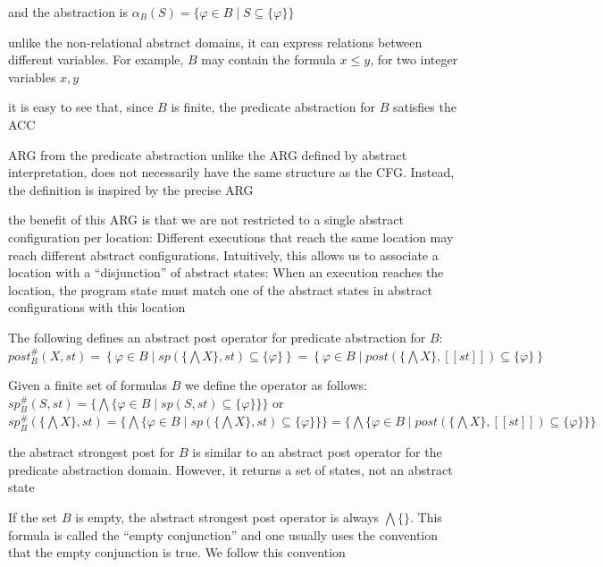 \documentclass[landscape, a4paper]{article}
\begin{document}
\begin{minipage}[t]{0.2\linewidth}
\begin{betterlist}
\begin{betterlist}
			\item and the abstraction is $\alpha_B(S) = \{\varphi \in B \mid S \subseteq \{\varphi\}\}$
		\end{betterlist}\color{black}
		\item unlike the non-relational abstract domains, it can express relations between different variables. For example, $B$ may contain the formula $x \le y$, for two integer variables $x, y$
		\item it is easy to see that, since $B$ is finite, the predicate abstraction for $B$ satisfies the ACC
		\item ARG from the predicate abstraction unlike the ARG defined by abstract interpretation, does not necessarily have the same structure as the CFG. Instead, the definition is inspired by the precise ARG
		\item the benefit of this ARG is that we are not restricted to a single abstract configuration per location: Different executions that reach the same location may reach different abstract configurations. Intuitively, this allows us to associate a location with a \enquote{disjunction} of abstract states: When an execution reaches the location, the program state must match one of the abstract states in abstract configurations with this location
		\item \color{violet}The following defines an \alert{abstract post operator} for predicate abstraction for $B$: $post^\#_B(X, st) = \left\{\varphi \in B \mid sp(\{\bigwedge X\}, st) \subseteq \{\varphi\}\right\} = \left\{\varphi \in B \mid post(\{\bigwedge X\}, [[st]]) \subseteq \{\varphi\}\right\}$\color{black}
		\item \color{orange}Given a finite set of formulas $B$ we define the  operator as follows: $sp^\#_B(S, st) = \{\bigwedge \{\varphi \in B \mid sp(S, st) \subseteq \{\varphi\}\}\}$ or $sp^\#_B(\{\bigwedge X\}, st) = \{\bigwedge \{\varphi \in B \mid sp(\{\bigwedge X\}, st) \subseteq \{\varphi\}\}\} = \{\bigwedge \{\varphi \in B \mid post(\{\bigwedge X\}, [[st]]) \subseteq \{\varphi\}\}\}$\color{black}
		\begin{betterlist}
			\item the abstract strongest post for $B$ is similar to an abstract post operator for the predicate abstraction domain. However, it returns a set of states, not an abstract state
			\item If the set $B$ is empty, the abstract strongest post operator is always $\bigwedge\{\}$. This formula is called the \enquote{empty conjunction} and one usually uses the convention that the empty conjunction is true. We follow this convention

\end{betterlist}
\end{betterlist}
\end{minipage}
\end{document}
